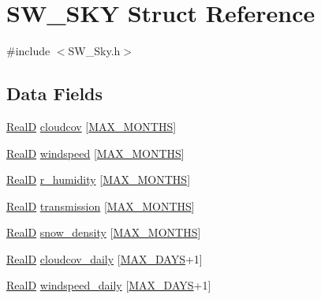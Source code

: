 \hypertarget{struct_s_w___s_k_y}{}\section{S\+W\+\_\+\+S\+KY Struct Reference}
\label{struct_s_w___s_k_y}


{\ttfamily \#include $<$S\+W\+\_\+\+Sky.\+h$>$}

\subsection*{Data Fields}
\begin{DoxyCompactItemize}
\item 
\hyperlink{generic_8h_af1c105fd5732f70b91ddaeda0cc340e3}{RealD} \hyperlink{struct_s_w___s_k_y_af017b36b9b0ac37ede5f754370feacd6}{cloudcov} \mbox{[}\hyperlink{_times_8h_a9c97e6841188b672e984a4eba7479277}{M\+A\+X\+\_\+\+M\+O\+N\+T\+HS}\mbox{]}
\item 
\hyperlink{generic_8h_af1c105fd5732f70b91ddaeda0cc340e3}{RealD} \hyperlink{struct_s_w___s_k_y_aca3ab26df7089417506c37978cb7f418}{windspeed} \mbox{[}\hyperlink{_times_8h_a9c97e6841188b672e984a4eba7479277}{M\+A\+X\+\_\+\+M\+O\+N\+T\+HS}\mbox{]}
\item 
\hyperlink{generic_8h_af1c105fd5732f70b91ddaeda0cc340e3}{RealD} \hyperlink{struct_s_w___s_k_y_a83efc4f0d50703fb68cba8499d06ad23}{r\+\_\+humidity} \mbox{[}\hyperlink{_times_8h_a9c97e6841188b672e984a4eba7479277}{M\+A\+X\+\_\+\+M\+O\+N\+T\+HS}\mbox{]}
\item 
\hyperlink{generic_8h_af1c105fd5732f70b91ddaeda0cc340e3}{RealD} \hyperlink{struct_s_w___s_k_y_aa6e86848395fa97cf26c2dddebbb23a0}{transmission} \mbox{[}\hyperlink{_times_8h_a9c97e6841188b672e984a4eba7479277}{M\+A\+X\+\_\+\+M\+O\+N\+T\+HS}\mbox{]}
\item 
\hyperlink{generic_8h_af1c105fd5732f70b91ddaeda0cc340e3}{RealD} \hyperlink{struct_s_w___s_k_y_a89810fdf277f73bd5775cf8eadab4e41}{snow\+\_\+density} \mbox{[}\hyperlink{_times_8h_a9c97e6841188b672e984a4eba7479277}{M\+A\+X\+\_\+\+M\+O\+N\+T\+HS}\mbox{]}
\item 
\hyperlink{generic_8h_af1c105fd5732f70b91ddaeda0cc340e3}{RealD} \hyperlink{struct_s_w___s_k_y_a5bc5d73d1ff5698d0854ed96b1f9efd9}{cloudcov\+\_\+daily} \mbox{[}\hyperlink{_times_8h_a01f08d46080872b9f4284873b7f9dee4}{M\+A\+X\+\_\+\+D\+A\+YS}+1\mbox{]}
\item 
\hyperlink{generic_8h_af1c105fd5732f70b91ddaeda0cc340e3}{RealD} \hyperlink{struct_s_w___s_k_y_a4ff5ab990d3ea971d383440c6548541f}{windspeed\+\_\+daily} \mbox{[}\hyperlink{_times_8h_a01f08d46080872b9f4284873b7f9dee4}{M\+A\+X\+\_\+\+D\+A\+YS}+1\mbox{]}

\end{DoxyCompactItemize}
